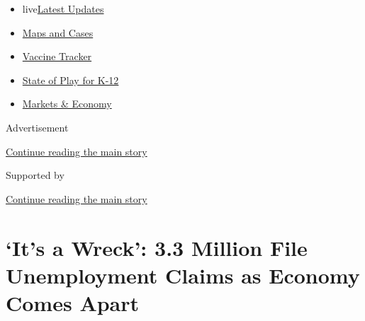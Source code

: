 \begin{itemize}
\tightlist
\item
  live\href{https://www.nytimes3xbfgragh.onion/2020/08/17/world/coronavirus-covid.html?name=styln-coronavirus-markets\&region=TOP_BANNER\&variant=undefined\&block=storyline_menu_recirc\&action=click\&pgtype=Article\&impression_id=f0a00bb1-e108-11ea-8e18-f56000f9fafb}{Latest
  Updates}
\item
  \href{https://www.nytimes3xbfgragh.onion/interactive/2020/us/coronavirus-us-cases.html?name=styln-coronavirus-markets\&region=TOP_BANNER\&variant=undefined\&block=storyline_menu_recirc\&action=click\&pgtype=Article\&impression_id=f0a00bb2-e108-11ea-8e18-f56000f9fafb}{Maps
  and Cases}
\item
  \href{https://www.nytimes3xbfgragh.onion/interactive/2020/science/coronavirus-vaccine-tracker.html?name=styln-coronavirus-markets\&region=TOP_BANNER\&variant=undefined\&block=storyline_menu_recirc\&action=click\&pgtype=Article\&impression_id=f0a00bb3-e108-11ea-8e18-f56000f9fafb}{Vaccine
  Tracker}
\item
  \href{https://www.nytimes3xbfgragh.onion/2020/08/17/us/k-12-schools-reopening.html?name=styln-coronavirus-markets\&region=TOP_BANNER\&variant=undefined\&block=storyline_menu_recirc\&action=click\&pgtype=Article\&impression_id=f0a00bb4-e108-11ea-8e18-f56000f9fafb}{State
  of Play for K-12}
\item
  \href{https://www.nytimes3xbfgragh.onion/live/2020/08/17/business/stock-market-today-coronavirus?name=styln-coronavirus-markets\&region=TOP_BANNER\&variant=undefined\&block=storyline_menu_recirc\&action=click\&pgtype=Article\&impression_id=f0a032c0-e108-11ea-8e18-f56000f9fafb}{Markets
  \& Economy}
\end{itemize}

Advertisement

\protect\hyperlink{after-top}{Continue reading the main story}

Supported by

\protect\hyperlink{after-sponsor}{Continue reading the main story}

\hypertarget{its-a-wreck-33-million-file-unemployment-claims-as-economy-comes-apart}{%
\section{`It's a Wreck': 3.3 Million File Unemployment Claims as Economy
Comes
Apart}\label{its-a-wreck-33-million-file-unemployment-claims-as-economy-comes-apart}}

